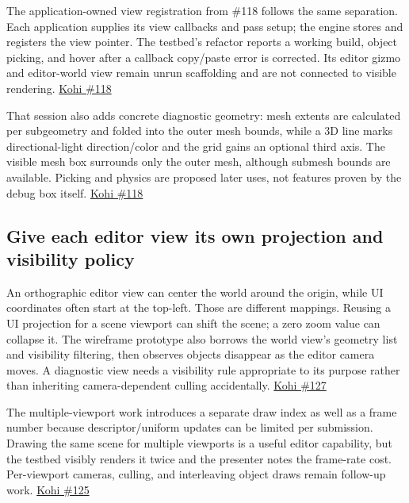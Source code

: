 The application-owned view registration from \#118 follows the same separation. Each application supplies its view callbacks and pass setup; the engine stores and registers the view pointer. The testbed's refactor reports a working build, object picking, and hover after a callback copy/paste error is corrected. Its editor gizmo and editor-world view remain unrun scaffolding and are not connected to visible rendering. \href{https://www.youtube.com/watch?v=CjJqa3iILAQ}{Kohi \#118}

That session also adds concrete diagnostic geometry: mesh extents are calculated per subgeometry and folded into the outer mesh bounds, while a 3D line marks directional-light direction/color and the grid gains an optional third axis. The visible mesh box surrounds only the outer mesh, although submesh bounds are available. Picking and physics are proposed later uses, not features proven by the debug box itself. \href{https://www.youtube.com/watch?v=CjJqa3iILAQ}{Kohi \#118}

\subsection{Give each editor view its own projection and visibility policy}\label{06-engine-ii-ch032-give-each-editor-view-its-own-projection-and-visibility-policy}

\hypertarget{06-engine-ii-ch032-give-each-editor-view-its-own-projection-and-visibility-policy}{}

An orthographic editor view can center the world around the origin, while UI coordinates often start at the top-left. Those are different mappings. Reusing a UI projection for a scene viewport can shift the scene; a zero zoom value can collapse it. The wireframe prototype also borrows the world view's geometry list and visibility filtering, then observes objects disappear as the editor camera moves. A diagnostic view needs a visibility rule appropriate to its purpose rather than inheriting camera-dependent culling accidentally. \href{https://www.youtube.com/watch?v=5i66-I3x9ug}{Kohi \#127}

The multiple-viewport work introduces a separate draw index as well as a frame number because descriptor/uniform updates can be limited per submission. Drawing the same scene for multiple viewports is a useful editor capability, but the testbed visibly renders it twice and the presenter notes the frame-rate cost. Per-viewport cameras, culling, and interleaving object draws remain follow-up work. \href{https://www.youtube.com/watch?v=7ejRGnfNiU0}{Kohi \#125}

